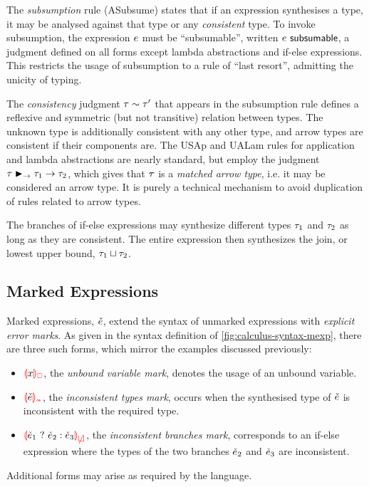 The \emph{subsumption} rule (ASubsume) states that if an expression synthesises a type, it may be
analysed against that type or any \emph{consistent} type. To invoke subsumption, the expression
$e$ must be ``subsumable'', written $e ~{\normalfont{\normalfont\textsf{subsumable}}}$, a judgment defined on all forms except
lambda abstractions and if-else expressions. This restricts the usage of subsumption to a rule of
``last resort'', admitting the unicity of typing.




The \emph{consistency} judgment $\tau \sim \tau'$ that appears in the subsumption rule
defines a reflexive and symmetric (but not transitive) relation between types. The unknown type is
additionally consistent with any other type, and arrow types are consistent if their components are.
The USAp and UALam rules for application and lambda abstractions are nearly standard, but employ the
judgment $\tau \blacktriangleright_{\to} \tau_1 \to \tau_2$, which gives that $\tau$ is a \emph{matched arrow
type}, i.e. it may be considered an arrow type. It is purely a technical mechanism to avoid
duplication of rules related to arrow types.



The branches of if-else expressions may synthesize different types $\tau_1$ and $\tau_2$ as long as
they are consistent. The entire expression then synthesizes the join, or lowest upper bound,
$\tau_1 \sqcup \tau_2$.

\subsection{Marked Expressions}
\label{sec:calculus-mexp}

Marked expressions, $\check{e}$, extend the syntax of unmarked expressions with \emph{explicit error
marks}. As given in the syntax definition of \cref{fig:calculus-syntax-mexp}, there are three such
forms, which mirror the examples discussed previously:
%
\begin{itemize} %
  \item $\ECUnbound{x}$, the \emph{unbound variable mark}, denotes the usage of an unbound variable.

  \item $\ECInconType{\ECMV}$, the \emph{inconsistent types mark}, occurs when the synthesised type
    of $\check{e}$ is inconsistent with the required type.

  \item $\ECInconBr{\ECMV_1}{\ECMV_2}{\ECMV_3}$, the \emph{inconsistent branches mark}, corresponds
    to an if-else expression where the types of the two branches $\check{e}_2$ and $\check{e}_3$ are
    inconsistent.
\end{itemize}
%
Additional forms may arise as required by the language.

